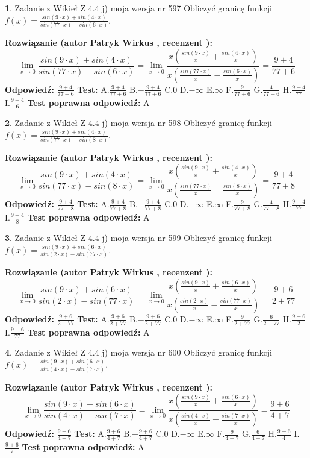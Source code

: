 \documentclass[12pt, a4paper]{article}
\theoremstyle{definition} %
\newtheorem{zad}{}
\newcommand{\zadStart}[1]{\begin{zad}#1\newline}
\newcommand{\zadStop}{\end{zad}}
\newcommand{\rozwStart}[2]{\noindent \textbf{Rozwiązanie (autor #1 , recenzent #2): }\newline}
\newcommand{\rozwStop}{\newline}
\newcommand{\odpStart}{\noindent \textbf{Odpowiedź:}\newline}
\newcommand{\odpStop}{\newline}
\newcommand{\testStart}{\noindent \textbf{Test:}\newline}
\newcommand{\testStop}{\newline}
\newcommand{\kluczStart}{\noindent \textbf{Test poprawna odpowiedź:}\newline}
\newcommand{\kluczStop}{\newline}
\begin{document}
\zadStart{Zadanie z Wikieł Z 4.4 j) moja wersja nr 597}
Obliczyć granicę funkcji $f(x)=\frac{sin(9\cdot x) +sin(4\cdot x)}{sin(77\cdot x) -sin(6\cdot x)}$.
\zadStop
\rozwStart{Patryk Wirkus}{}
$$\lim\limits_{x\to 0}\frac{sin(9\cdot x) +sin(4\cdot x)}{sin(77\cdot x) -sin(6\cdot x)}=\lim\limits_{x\to 0}\frac{x(\frac{sin(9\cdot x)}{x}+\frac{sin(4\cdot x)}{x})}{x(\frac{sin(77\cdot x)}{x}-\frac{sin(6\cdot x)}{x})}=\frac{9+4}{77+6}$$
\rozwStop
\odpStart
$\frac{9+4}{77+6}$
\odpStop
\testStart
A.$\frac{9+4}{77+6}$
B.$-\frac{9+4}{77+6}$
C.$0$
D.$-\infty$
E.$\infty$
F.$\frac{9}{77+6}$
G.$\frac{4}{77+6}$
H.$\frac{9+4}{77}$
I.$\frac{9+4}{6}$
\testStop
\kluczStart
A
\kluczStop



\zadStart{Zadanie z Wikieł Z 4.4 j) moja wersja nr 598}
Obliczyć granicę funkcji $f(x)=\frac{sin(9\cdot x) +sin(4\cdot x)}{sin(77\cdot x) -sin(8\cdot x)}$.
\zadStop
\rozwStart{Patryk Wirkus}{}
$$\lim\limits_{x\to 0}\frac{sin(9\cdot x) +sin(4\cdot x)}{sin(77\cdot x) -sin(8\cdot x)}=\lim\limits_{x\to 0}\frac{x(\frac{sin(9\cdot x)}{x}+\frac{sin(4\cdot x)}{x})}{x(\frac{sin(77\cdot x)}{x}-\frac{sin(8\cdot x)}{x})}=\frac{9+4}{77+8}$$
\rozwStop
\odpStart
$\frac{9+4}{77+8}$
\odpStop
\testStart
A.$\frac{9+4}{77+8}$
B.$-\frac{9+4}{77+8}$
C.$0$
D.$-\infty$
E.$\infty$
F.$\frac{9}{77+8}$
G.$\frac{4}{77+8}$
H.$\frac{9+4}{77}$
I.$\frac{9+4}{8}$
\testStop
\kluczStart
A
\kluczStop



\zadStart{Zadanie z Wikieł Z 4.4 j) moja wersja nr 599}
Obliczyć granicę funkcji $f(x)=\frac{sin(9\cdot x) +sin(6\cdot x)}{sin(2\cdot x) -sin(77\cdot x)}$.
\zadStop
\rozwStart{Patryk Wirkus}{}
$$\lim\limits_{x\to 0}\frac{sin(9\cdot x) +sin(6\cdot x)}{sin(2\cdot x) -sin(77\cdot x)}=\lim\limits_{x\to 0}\frac{x(\frac{sin(9\cdot x)}{x}+\frac{sin(6\cdot x)}{x})}{x(\frac{sin(2\cdot x)}{x}-\frac{sin(77\cdot x)}{x})}=\frac{9+6}{2+77}$$
\rozwStop
\odpStart
$\frac{9+6}{2+77}$
\odpStop
\testStart
A.$\frac{9+6}{2+77}$
B.$-\frac{9+6}{2+77}$
C.$0$
D.$-\infty$
E.$\infty$
F.$\frac{9}{2+77}$
G.$\frac{6}{2+77}$
H.$\frac{9+6}{2}$
I.$\frac{9+6}{77}$
\testStop
\kluczStart
A
\kluczStop



\zadStart{Zadanie z Wikieł Z 4.4 j) moja wersja nr 600}
Obliczyć granicę funkcji $f(x)=\frac{sin(9\cdot x) +sin(6\cdot x)}{sin(4\cdot x) -sin(7\cdot x)}$.
\zadStop
\rozwStart{Patryk Wirkus}{}
$$\lim\limits_{x\to 0}\frac{sin(9\cdot x) +sin(6\cdot x)}{sin(4\cdot x) -sin(7\cdot x)}=\lim\limits_{x\to 0}\frac{x(\frac{sin(9\cdot x)}{x}+\frac{sin(6\cdot x)}{x})}{x(\frac{sin(4\cdot x)}{x}-\frac{sin(7\cdot x)}{x})}=\frac{9+6}{4+7}$$
\rozwStop
\odpStart
$\frac{9+6}{4+7}$
\odpStop
\testStart
A.$\frac{9+6}{4+7}$
B.$-\frac{9+6}{4+7}$
C.$0$
D.$-\infty$
E.$\infty$
F.$\frac{9}{4+7}$
G.$\frac{6}{4+7}$
H.$\frac{9+6}{4}$
I.$\frac{9+6}{7}$
\testStop
\kluczStart
A
\kluczStop
\end{document}
